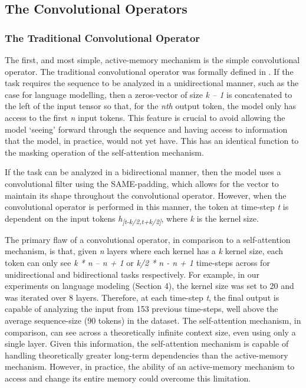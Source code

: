 \documentclass{article}
\begin{document}
\subsection{The Convolutional Operators}

\subsubsection{The Traditional Convolutional Operator } 

The first, and most simple, active-memory mechanism is the simple convolutional operator. The traditional convolutional operator was formally defined in \cite{bai}. If the task requires the sequence to be analyzed in a unidirectional manner, such as the case for language modelling, then a zeros-vector of size \textit{k – 1} is concatenated to the left of the input tensor so that, for the \textit{nth} output token, the model only has access to the first \textit{n} input tokens. This feature is crucial to avoid allowing the model ‘seeing’ forward through the sequence and having access to information that the model, in practice, would not yet have. This has an identical function to the masking operation of the self-attention mechanism.

If the task can be analyzed in a bidirectional manner, then the model uses a convolutional filter using the SAME-padding, which allows for the vector to maintain its shape throughout the convolutional operator. However, when the convolutional operator is performed in this manner, the token at time-step \textit{t} is dependent on the input tokens \textit{h\textsubscript{[t-k/2,t+k/2]}}, where \textit{k} is the kernel size.

The primary flaw of a convolutional operator, in comparison to a self-attention mechanism, is that, given \textit{n} layers where each kernel has a \textit{k} kernel size, each token can only see \textit{k * n – n + 1} or \textit{k/2 * n - n + 1} time-steps across for unidirectional and bidirectional tasks respectively. For example, in our experiments on language modeling (Section 4), the kernel size was set to 20 and was iterated over 8 layers. Therefore, at each time-step \textit{t}, the final output is capable of analyzing the input from 153 previous time-steps, well above the average sequence-size (90 tokens) in the dataset.
The self-attention mechanism, in comparison, can see across a theoretically infinite context size, even using only a single layer. Given this information, the self-attention mechanism is capable of handling theoretically greater long-term dependencies than the active-memory mechanism. However, in practice, the ability of an active-memory mechanism to access and change its entire memory could overcome this limitation.
\end{document}
